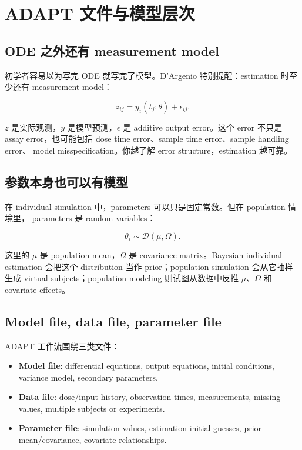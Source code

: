 \documentclass[a4paper]{article}
\newcommand{\concept}[1]{\textbf{#1}}
\begin{document}
\section{ADAPT 文件与模型层次}

\subsection{ODE 之外还有 measurement model}

初学者容易以为写完 ODE 就写完了模型。D'Argenio 特别提醒：estimation 时至少还有
measurement model：

\[
  z_{ij}=y_i(t_j;\theta)+\epsilon_{ij}.
\]

\(z\) 是实际观测，\(y\) 是模型预测，\(\epsilon\) 是 additive output error。这个 error
不只是 assay error，也可能包括 dose time error、sample time error、sample handling error、
model misspecification。你越了解 error structure，estimation 越可靠。

\subsection{参数本身也可以有模型}

在 individual simulation 中，parameters 可以只是固定常数。但在 population 情境里，
parameters 是 random variables：

\[
  \theta_i \sim \mathcal{D}(\mu,\Omega).
\]

这里的 \(\mu\) 是 population mean，\(\Omega\) 是 covariance matrix。Bayesian individual
estimation 会把这个 distribution 当作 prior；population simulation 会从它抽样生成 virtual
subjects；population modeling 则试图从数据中反推 \(\mu\)、\(\Omega\) 和 covariate effects。

\subsection{Model file, data file, parameter file}

ADAPT 工作流围绕三类文件：

\begin{itemize}
  \item \concept{Model file}: differential equations, output equations, initial conditions, variance model, secondary parameters.
  \item \concept{Data file}: dose/input history, observation times, measurements, missing values, multiple subjects or experiments.
  \item \concept{Parameter file}: simulation values, estimation initial guesses, prior mean/covariance, covariate relationships.
\end{itemize}
\end{document}
